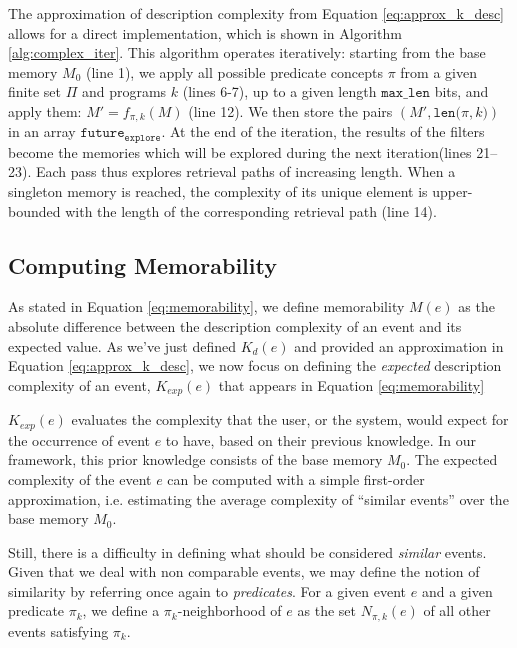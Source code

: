 \documentclass[entropy,article,submit,moreauthors,pdftex]{Definitions/mdpi}
\begin{document}
The approximation of description complexity from Equation \ref{eq:approx_k_desc} allows for
a direct implementation, which is shown in Algorithm \ref{alg:complex_iter}. This
algorithm operates iteratively: starting from the base memory $M_0$
(line 1), we apply all possible predicate concepts $\pi$ from a given finite set
$\Pi$ and programs $k$ (lines 6-7), up to a given length $\mathtt
    {max\_len}$ bits, and apply them: $M' = f_{\pi, k}(M)$ (line 12). We then store
the pairs $(M', \mathtt{len(}\pi, k\mathtt{)})$ in an array $\mathtt{future_
            {explore}}$. At the end of the iteration, the results of the filters become the
memories which will be explored during the next iteration(lines 21--23). Each
pass thus explores retrieval paths of increasing length. When a singleton memory
is reached, the complexity of its unique element is upper-bounded with the
length of the corresponding retrieval path (line 14).

\subsection{Computing Memorability}
As stated in Equation \ref{eq:memorability}, we define memorability $M(e)$ as the absolute difference between the description complexity of an event and its expected value. As we've just defined $K_d(e)$ and provided an approximation in Equation \ref{eq:approx_k_desc}, we now focus on defining the \emph{expected} description complexity of an event, $K_{exp}(e)$ that appears in Equation \ref{eq:memorability}

$K_{exp}(e)$ evaluates the complexity that the user, or the system, would expect for the occurrence of event $e$ to have, based on their previous knowledge. In our framework, this prior knowledge consists of the base memory $M_0$. The expected complexity of the event $e$ can be computed with a simple first-order approximation, i.e. estimating the average complexity of ``similar events'' over the base memory $M_0$.

Still, there is a difficulty in defining what
should be considered \emph{similar} events. Given that we deal with non comparable events, we may define the notion of similarity by referring once again to \emph{predicates}. For a given event $e$ and a given predicate $\pi_k$, we define a $\pi_k$-neighborhood of $e$ as the set $N_{\pi, k}(e)$ of all other events satisfying $\pi_k$.
\end{document}
